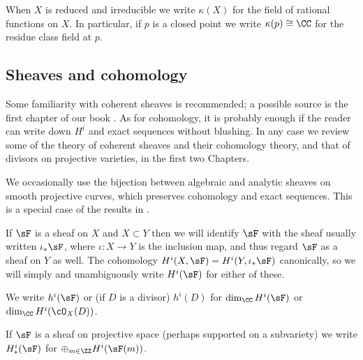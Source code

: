 When $X$ is reduced and irreducible we write $\kappa(X)$ for the field of rational functions on $X$. In particular, if
$p$ is a closed point  we write $\kappa(p)\cong \CC$ for the residue class field at $p$.

\subsection {Sheaves and cohomology} 

Some familiarity with coherent sheaves is recommended; a possible source is
the first chapter of our book \cite{GeomSchemes}. 
As for cohomology, it is probably enough if the reader can write down $H^i$ and exact sequences without blushing.
In any case we review some of the theory of coherent sheaves and their cohomology theory, and that of divisors on projective 
varieties, in the first two Chapters. 

We occasionally use the bijection between algebraic and analytic sheaves on smooth projective curves, which preserves
cohomology and exact sequences. This is a special case of the results in \cite{GAGA}. 

If $\sF$ is a sheaf on $X$ and $X\subset Y$ then we will identify $\sF$ with
the sheaf usually written $\iota_*\sF$, where $\iota:X\to Y$ is the inclusion map,
 and thus regard $\sF$ as a sheaf on $Y$ as well.
The cohomology  $H^i(X, \sF) = H^i(Y,\iota_*\sF)$ canonically, so we will
simply and unambiguously write $H^i(\sF)$ for either of these. 

We write $h^i(\sF)$ or (if $D$ is a divisor) $h^{i}(D)$ for 
$\dim_{\CC}H^i(\sF)$ or $\dim_{\CC}H^i(\cO_X(D))$. 

If $\sF$ is a sheaf on projective space (perhaps supported on a subvariety) we write $H^i_*(\sF)$ for
$\oplus_{m\in \ZZ} H^i(\sF(m))$. 





